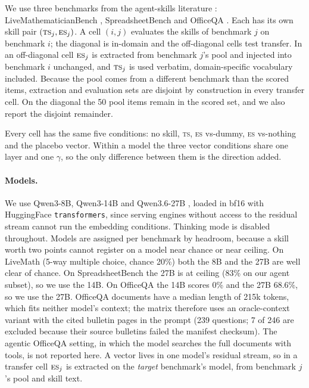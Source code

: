 \documentclass[11pt]{article}
\newcommand{\TS}{\textsc{ts}}
\newcommand{\ES}{\textsc{es}}
\begin{document}
We use three benchmarks from the agent-skills literature \citep{tang2026wikiskill}:
LiveMathematicianBench \citep{he2026livemath}, SpreadsheetBench \citep{ma2024spreadsheetbench} and
OfficeQA \citep{databricks2025officeqa}. Each has its own skill pair $(\TS_j, \ES_j)$. A cell $(i,j)$
evaluates the skills of benchmark $j$ on benchmark $i$; the diagonal is in-domain and the
off-diagonal cells test transfer. In an off-diagonal cell $\ES_j$ is extracted from benchmark $j$'s
pool and injected into benchmark $i$ unchanged, and $\TS_j$ is used verbatim, domain-specific
vocabulary included. Because the pool comes from a different benchmark than the scored items,
extraction and evaluation sets are disjoint by construction in every transfer cell. On the diagonal
the 50 pool items remain in the scored set, and we also report the disjoint remainder.

Every cell has the same five conditions: no skill, \TS, \ES{} vs-dummy, \ES{} vs-nothing and the
placebo vector. Within a model the three vector conditions share one layer and one $\gamma$, so the
only difference between them is the direction added.

\paragraph{Models.} We use Qwen3-8B, Qwen3-14B \citep{qwen3report} and Qwen3.6-27B \citep{qwen36},
loaded in bf16 with HuggingFace \texttt{transformers}, since serving engines without access to the
residual stream cannot run the embedding conditions. Thinking mode is disabled throughout. Models
are assigned per benchmark by headroom, because a skill worth two points cannot register on a model
near chance or near ceiling. On LiveMath (5-way multiple choice, chance 20\%) both the 8B and the 27B
are well clear of chance. On SpreadsheetBench the 27B is at ceiling (83\% on our agent subset), so
we use the 14B. On OfficeQA the 14B scores 0\% and the 27B 68.6\%, so we use the 27B. OfficeQA
documents have a median length of 215k tokens, which fits neither model's context; the matrix
therefore uses an oracle-context variant with the cited bulletin pages in the prompt (239
questions; 7 of 246 are excluded because their source bulletins failed the manifest checksum).
The agentic OfficeQA setting, in which the model searches the full documents with tools, is not
reported here. A vector lives in one model's residual stream, so
in a transfer cell $\ES_j$ is extracted on the \emph{target} benchmark's model, from benchmark $j$'s
pool and skill text.
\end{document}
